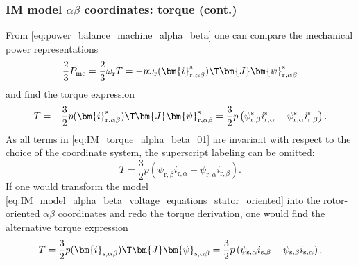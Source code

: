 \begin{frame}
	\frametitle{IM model $\alpha\beta$ coordinates: torque (cont.)}
    From \eqref{eq:power_balance_machine_alpha_beta} one can compare the mechanical power representations
    \begin{equation}
        \frac{2}{3}P_\mathrm{me} = \frac{2}{3} \omega_\mathrm{r} T = -p\omega_\mathrm{r}(\bm{i}^\mathrm{s}_\mathrm{r,\alpha\beta})\T\bm{J}\bm{\psi}^\mathrm{s}_\mathrm{r,\alpha\beta}
    \end{equation}
    \pause
    and find the torque expression
    \begin{equation}
        T = -\frac{3}{2} p (\bm{i}^\mathrm{s}_\mathrm{r,\alpha\beta})\T\bm{J}\bm{\psi}^\mathrm{s}_\mathrm{r,\alpha\beta} = \frac{3}{2} p \left(\psi_{\mathrm{r},\beta}^\mathrm{s} i_{\mathrm{r},\alpha}^\mathrm{s} - \psi_{\mathrm{r},\alpha}^\mathrm{s}i_{\mathrm{r},\beta}^\mathrm{s}\right).
        \label{eq:IM_torque_alpha_beta_01}
    \end{equation}
    \pause
    As all terms in \eqref{eq:IM_torque_alpha_beta_01} are invariant with respect to the choice of the coordinate system, the superscript labeling can be omitted:
    \begin{equation}
        T = \frac{3}{2} p \left(\psi_{\mathrm{r},\beta} i_{\mathrm{r},\alpha} - \psi_{\mathrm{r},\alpha}i_{\mathrm{r},\beta}\right).
        \label{eq:IM_torque_alpha_beta_02}
    \end{equation}
    \pause
    If one would transform the model \eqref{eq:IM_model_alpha_beta_voltage_equations_stator_oriented} into the rotor-oriented $\alpha\beta$ coordinates and redo the torque derivation, one would find the alternative torque expression
    \begin{equation}
        T = \frac{3}{2} p (\bm{i}_\mathrm{s,\alpha\beta})\T\bm{J}\bm{\psi}_\mathrm{s,\alpha\beta} = \frac{3}{2} p \left(\psi_{\mathrm{s},\alpha}i_{\mathrm{s},\beta} - \psi_{\mathrm{s},\beta} i_{\mathrm{s},\alpha} \right).
    \end{equation}
\end{frame}


